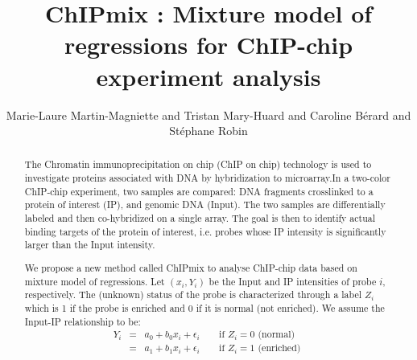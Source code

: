 \documentclass{svmult}
\begin{document}
\title*{ChIPmix : Mixture model of regressions for ChIP-chip experiment analysis}

\author{Marie-Laure Martin-Magniette and Tristan Mary-Huard and Caroline B\'erard and St\'ephane Robin}

\maketitle

\begin{abstract}
The Chromatin immunoprecipitation on chip (ChIP on chip) technology is used to investigate proteins associated with DNA by hybridization to microarray.In a two-color ChIP-chip experiment, two samples are compared:
DNA fragments crosslinked to a protein of interest (IP), and genomic DNA (Input).
The two samples are differentially labeled and then co-hybridized on a single array.
The goal is then to identify actual binding targets of the protein of
interest, i.e. probes whose IP intensity is significantly larger
than the Input intensity. {\par}
We propose a new method called ChIPmix to analyse ChIP-chip data based
on mixture model of regressions. 
Let $(x_i,Y_i)$ be the Input and IP intensities of probe $i$,
respectively. The (unknown) status of the probe is characterized
through a label $Z_i$ which is 1 if the probe is enriched and 0 if
it is normal (not enriched). We assume the Input-IP relationship to
be: 
\begin{eqnarray}
Y_i &=& a_0 + b_0 x_i + \epsilon_i  \qquad \text{if } Z_i=0 \text{ (normal) } \nonumber\\
 &=& a_1 + b_1 x_i + \epsilon_i  \qquad \text{if } Z_i=1 \text{  (enriched) } \nonumber

\end{eqnarray}
\end{abstract}
\end{document}
